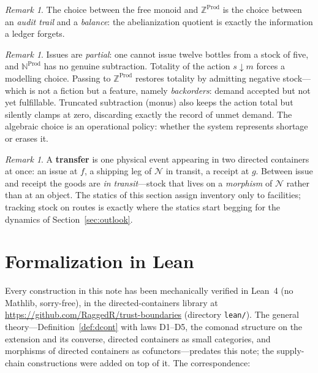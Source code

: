 \documentclass[11pt,a4paper]{article}
\newcommand{\N}{\mathcal{N}}
\newcommand{\dc}{\mathbin{\downarrow}}
\newcommand{\Prod}{\mathrm{Prod}}
\theoremstyle{plain}
\theoremstyle{definition}
\theoremstyle{remark}
\newtheorem{remark}[theorem]{Remark}
\begin{document}
\begin{remark}
The choice between the free monoid and $\mathbb{Z}^{\Prod}$ is the
choice between an \emph{audit trail} and a \emph{balance}: the
abelianization quotient is exactly the information a ledger forgets.
\end{remark}

\begin{remark}
Issues are \emph{partial}: one cannot issue twelve bottles from a stock
of five, and $\mathbb{N}^{\Prod}$ has no genuine subtraction. Totality
of the action $s \dc m$ forces a modelling choice. Passing to
$\mathbb{Z}^{\Prod}$ restores totality by admitting negative
stock---which is not a fiction but a feature, namely
\emph{backorders}: demand accepted but not yet fulfillable.
Truncated subtraction (monus) also keeps the action total but silently
clamps at zero, discarding exactly the record of unmet demand. The
algebraic choice is an operational policy: whether the system
represents shortage or erases it.
\end{remark}

\begin{remark}
A \textbf{transfer} is one physical event appearing in two directed
containers at once: an issue at $f$, a shipping leg of $\N$ in
transit, a receipt at $g$. Between issue and receipt the goods are
\emph{in transit}---stock that lives on a \emph{morphism} of $\N$
rather than at an object. The statics of this section assign
inventory only to facilities; tracking stock on routes is exactly
where the statics start begging for the dynamics of
Section~\ref{sec:outlook}.
\end{remark}

\section{Formalization in Lean}\label{sec:formalization}

Every construction in this note has been mechanically verified in
Lean~4 (no Mathlib, sorry-free), in the directed-containers library at
\url{https://github.com/RaggedR/trust-boundaries} (directory
\texttt{lean/}). The general theory---Definition~\ref{def:dcont} with
laws D1--D5, the comonad structure on the extension and its converse,
directed containers as small categories, and morphisms of directed
containers as cofunctors---predates this note; the supply-chain
constructions were added on top of it. The correspondence:
\end{document}
